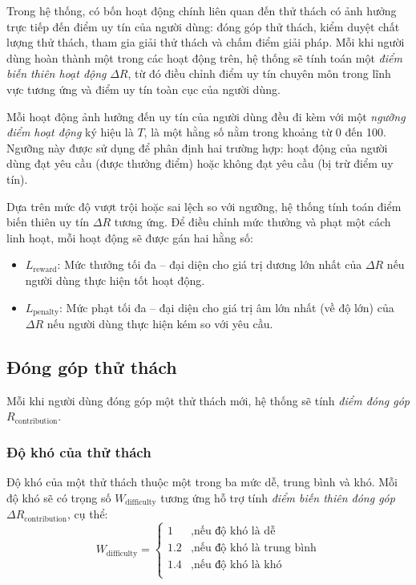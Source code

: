 Trong hệ thống, có bốn hoạt động chính liên quan đến thử thách có ảnh hưởng trực tiếp đến điểm uy tín của người dùng: đóng góp thử thách, kiểm duyệt chất lượng thử thách, tham gia giải thử thách và chấm điểm giải pháp.
Mỗi khi người dùng hoàn thành một trong các hoạt động trên, hệ thống sẽ tính toán một \textit{điểm biến thiên hoạt động} $\Delta R$, từ đó điều chỉnh điểm uy tín chuyên môn trong lĩnh vực tương ứng và điểm uy tín toàn cục của người dùng.

Mỗi hoạt động ảnh hưởng đến uy tín của người dùng đều đi kèm với một \textit{ngưỡng điểm hoạt động} ký hiệu là $T$, là một hằng số nằm trong khoảng từ 0 đến 100. 
Ngưỡng này được sử dụng để phân định hai trường hợp: hoạt động của người dùng đạt yêu cầu (được thưởng điểm) hoặc không đạt yêu cầu (bị trừ điểm uy tín).

Dựa trên mức độ vượt trội hoặc sai lệch so với ngưỡng, hệ thống tính toán điểm biến thiên uy tín $\Delta R$ tương ứng. Để điều chỉnh mức thưởng và phạt một cách linh hoạt, mỗi hoạt động sẽ được gán hai hằng số:
\begin{itemize}
  \item $L_{\text{reward}}$: Mức thưởng tối đa -- đại diện cho giá trị dương lớn nhất của $\Delta R$ nếu người dùng thực hiện tốt hoạt động.
  \item $L_{\text{penalty}}$: Mức phạt tối đa -- đại diện cho giá trị âm lớn nhất (về độ lớn) của $\Delta R$ nếu người dùng thực hiện kém so với yêu cầu.
\end{itemize}

\subsection{Đóng góp thử thách}

Mỗi khi người dùng đóng góp một thử thách mới, hệ thống sẽ tính \textit{điểm đóng góp} $R_{\text{contribution}}$.

\subsubsection{Độ khó của thử thách}

Độ khó của một thử thách thuộc một trong ba mức dễ, trung bình và khó. Mỗi độ khó sẽ có trọng số $W_{\text{difficulty}}$ tương ứng hỗ trợ tính \textit{điểm biến thiên đóng góp} $\Delta R_{\text{contribution}}$, cụ thể:
\[
  W_{\text{difficulty}} =
  \begin{cases}
    1   & , \text{nếu độ khó là dễ}         \\
    1.2 & , \text{nếu độ khó là trung bình} \\
    1.4 & , \text{nếu độ khó là khó}        \\
  \end{cases}
\]

